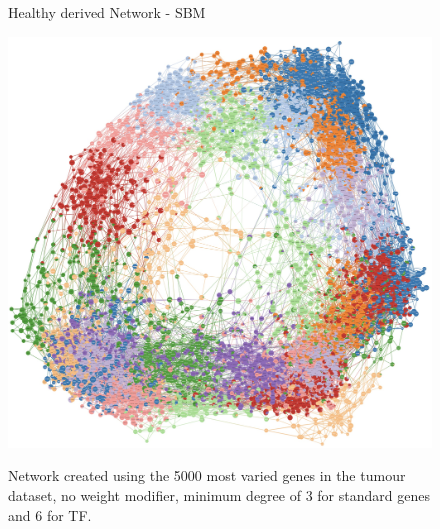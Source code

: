 
\newpage
{}
\begin{figure}[p]
      \thispagestyle{empty} %
      \centering
      \captionsetup{justification=centering, labelfont=bf}
      \parbox{\textwidth}{\centering \Huge Healthy derived Network - SBM       \vspace{0.5cm} } %
      \includegraphics[width=0.9\paperwidth,keepaspectratio]{Sections/Network_pages/images/sbm_standard_5K_6TF_lowRes.jpg} 
      \parbox{0.8\textwidth}{Network created using the 5000 most varied genes in the tumour dataset, no weight modifier, minimum degree of 3 for standard genes and 6 for TF.}
\end{figure}
\restoregeometry

